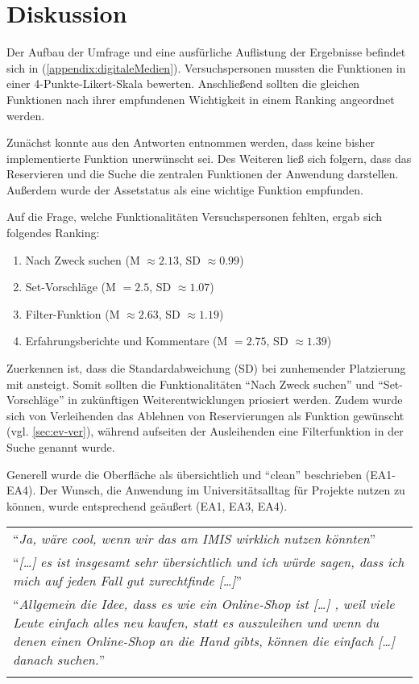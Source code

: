 \section{Diskussion}
\label{sec:disc}
Der Aufbau der Umfrage und eine ausfürliche Auflistung der Ergebnisse befindet sich in
(\ref{appendix:digitaleMedien}). Versuchspersonen mussten die Funktionen in einer
4-Punkte-Likert-Skala bewerten. Anschließend sollten die gleichen Funktionen nach ihrer empfundenen
Wichtigkeit in einem Ranking angeordnet werden. 

Zunächst konnte aus den Antworten entnommen werden, dass keine bisher implementierte
Funktion unerwünscht sei. Des Weiteren ließ sich folgern, dass das Reservieren und die Suche die
zentralen Funktionen der Anwendung darstellen. Außerdem wurde der Assetstatus als eine wichtige
Funktion empfunden.  

Auf die Frage, welche Funktionalitäten Versuchspersonen fehlten, ergab sich folgendes Ranking:
\begin{enumerate}
  \item Nach Zweck suchen (M \(\approx 2.13\), SD \(\approx 0.99\))
  \item Set-Vorschläge (M \( = 2.5\), SD \(\approx 1.07\))
  \item Filter-Funktion (M \( \approx 2.63\), SD \(\approx 1.19\))
  \item Erfahrungsberichte und Kommentare (M \( = 2.75\), SD \(\approx 1.39\))
\end{enumerate}

Zuerkennen ist, dass die Standardabweichung (SD) bei zunhemender Platzierung mit ansteigt. Somit
sollten die Funktionalitäten \enquote{Nach Zweck suchen} und \enquote{Set-Vorschläge}  in
zukünftigen Weiterentwicklungen priosiert werden.  Zudem wurde sich von Verleihenden das Ablehnen von
Reservierungen als Funktion gewünscht (vgl. \ref{sec:ev-ver}), während aufseiten der Ausleihenden
eine Filterfunktion in der Suche genannt wurde.



Generell wurde die Oberfläche als übersichtlich und \enquote{clean} beschrieben
(EA1-EA4). Der Wunsch, die Anwendung im Universitätsalltag für Projekte
nutzen zu können, wurde entsprechend geäußert (EA1, EA3, EA4).

\begin{longtable}{p{}} \arrayrulecolor{maincolor}\hline
  \enquote{\textit{Ja, wäre cool, wenn wir das am IMIS wirklich nutzen
  könnten}}                                                      \\
  \enquote{\textit{[\dots] es ist insgesamt sehr übersichtlich und ich würde
  sagen, dass ich mich auf jeden Fall gut zurechtfinde [\dots]}} \\
  \enquote{\textit{Allgemein die Idee, dass es wie ein Online-Shop ist [\dots] ,
      weil viele Leute einfach alles neu kaufen, statt es auszuleihen und wenn du
      denen einen Online-Shop an die Hand gibts, können die einfach [\dots] danach
  suchen.}}                                                      \\
  \arrayrulecolor{maincolor}\hline
\end{longtable}

